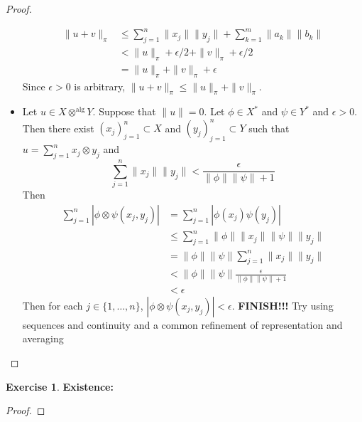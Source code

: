 \documentclass[12pt]{amsart}
\theoremstyle{definition}
\newtheorem{ex}[definition]{Exercise}
\newcommand{\ep}{\epsilon}
\begin{document}
\begin{proof}
\begin{itemize}
	\begin{align*}
	\|u + v\|_{\pi} 
	& \leq \sum\limits_{j=1}^n \|x_j\| \|y_j\| + \sum\limits_{k=1}^m \|a_k\| \|b_k\| \\
	&< \|u\|_{\pi} + \ep/2 + \|v\|_{\pi} + \ep/2 \\
	&= \|u\|_{\pi} + \|v\|_{\pi} + \ep
	\end{align*}
	Since $\ep >0$ is arbitrary, $\|u + v\|_{\pi} \leq \|u\|_{\pi} + \|v\|_{\pi}$.
	\item Let $u \in X \otimes^{\text{alg}} Y$. Suppose that $\|u\| = 0$. Let $\phi \in X^*$ and $\psi \in Y^*$ and $\ep >0$. Then there exist $(x_j)_{j=1}^n \subset X$ and $(y_j)_{j=1}^n \subset Y$ such that $u = \sum\limits_{j=1}^n x_j \otimes y_j $ and $$\sum\limits_{j=1}^n \|x_j\| \|y_j\| < \frac{\ep}{\|\phi\| \|\psi\| + 1}$$
	Then 
	\begin{align*}
	\sum_{j=1}^n |\phi \otimes \psi(x_j,y_j)|
	&=  \sum_{j=1}^n |\phi(x_j)\psi(y_j)| \\
	& \leq  \sum_{j=1}^n \|\phi\|\|x_j\| \|\psi\|\|y_j\| \\
	&= \|\phi\|\|\psi\|\sum_{j=1}^n \|x_j\| \|y_j\| \\
	& < \|\phi\|\|\psi\|\frac{\ep}{\|\phi\| \|\psi\| + 1} \\
	& < \ep
	\end{align*}
	Then for each $j \in \{1, \ldots, n\}$, $|\phi \otimes \psi(x_j,y_j)| < \ep$.
	\textbf{FINISH!!!} Try using sequences and continuity and a common refinement of representation and averaging
	\end{itemize}
	\end{proof}
	
	\begin{ex} \textbf{Existence:} \\
	
	\end{ex}
	
	\begin{proof}
	
	\end{proof}	
	
	
	
	
	
	
	
	
	
	
	
	
	
	
	
	
	
	
	
	
	
	
	
\end{document}
